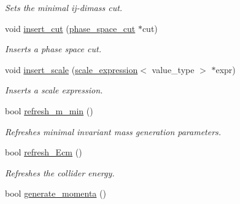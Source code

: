 \begin{DoxyCompactItemize}
\begin{DoxyCompactList}\small\item\em Sets the minimal ij-\/dimass cut. \end{DoxyCompactList}\item 
\hypertarget{a00436_a0f7e2e6245e29ba4f90b80368d3baf61}{}void \hyperlink{a00436_a0f7e2e6245e29ba4f90b80368d3baf61}{insert\+\_\+cut} (\hyperlink{a00419}{phase\+\_\+space\+\_\+cut} $\ast$cut)\label{a00436_a0f7e2e6245e29ba4f90b80368d3baf61}

\begin{DoxyCompactList}\small\item\em Inserts a phase space cut. \end{DoxyCompactList}\item 
\hypertarget{a00436_ab6bfad8e3fd161695f067475bdb844c0}{}void \hyperlink{a00436_ab6bfad8e3fd161695f067475bdb844c0}{insert\+\_\+scale} (\hyperlink{a00502}{scale\+\_\+expression}$<$ value\+\_\+type $>$ $\ast$expr)\label{a00436_ab6bfad8e3fd161695f067475bdb844c0}

\begin{DoxyCompactList}\small\item\em Inserts a scale expression. \end{DoxyCompactList}\item 
\hypertarget{a00436_a5dc7872eef01e7c3efa428b1de7474f1}{}bool \hyperlink{a00436_a5dc7872eef01e7c3efa428b1de7474f1}{refresh\+\_\+m\+\_\+min} ()\label{a00436_a5dc7872eef01e7c3efa428b1de7474f1}

\begin{DoxyCompactList}\small\item\em Refreshes minimal invariant mass generation parameters. \end{DoxyCompactList}\item 
\hypertarget{a00436_a3cfaa193508bb8b66508907cd78aa1ad}{}bool \hyperlink{a00436_a3cfaa193508bb8b66508907cd78aa1ad}{refresh\+\_\+\+Ecm} ()\label{a00436_a3cfaa193508bb8b66508907cd78aa1ad}

\begin{DoxyCompactList}\small\item\em Refreshes the collider energy. \end{DoxyCompactList}\item 
\hypertarget{a00436_a50a8b49e917532fd9eef3a6c4d92af26}{}bool \hyperlink{a00436_a50a8b49e917532fd9eef3a6c4d92af26}{generate\+\_\+momenta} ()\label{a00436_a50a8b49e917532fd9eef3a6c4d92af26}


\end{DoxyCompactItemize}
